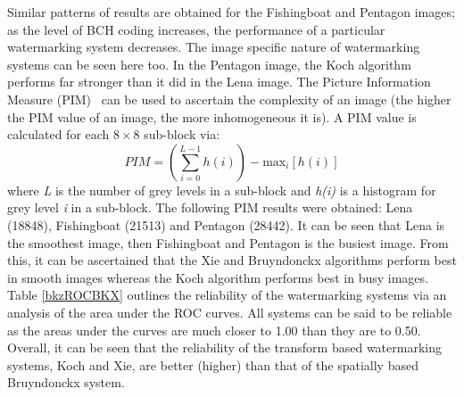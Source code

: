 \documentclass[10pt,twocolumn]{article}
\begin{document}
Similar patterns of results are obtained for the Fishingboat and Pentagon images; as the level of BCH coding increases,
the performance of a particular watermarking system decreases. The image specific nature of watermarking systems can be
seen here too. In the Pentagon image, the Koch algorithm performs far stronger than it did in the Lena image. 
The Picture Information Measure (PIM)~\cite{BKX:shinPIM} 
can be used to ascertain the complexity of an image (the higher the PIM value of an image, the more inhomogeneous it is).
A PIM value is calculated for each $8\times8$ sub-block via:
\begin{equation}
	PIM = \left( \sum^{L-1}_{i=0}h(i) \right) - \mbox{max}_{i}[h(i)]
\end{equation}
where \emph{L} is the number of grey levels in a sub-block and \emph{h(i)} is a histogram for grey level \emph{i} in a sub-block.
The following PIM results were obtained: Lena (18848), Fishingboat (21513) and Pentagon (28442). It can be seen that 
Lena is the smoothest image, then Fishingboat and Pentagon is the busiest image. From this, it can be ascertained that 
the Xie and Bruyndonckx algorithms perform best in smooth images whereas the Koch algorithm performs best in busy images. 
Table \ref{bkzROCBKX} outlines the reliability of the watermarking systems via an analysis of the area under the ROC curves.
All systems can be said to be reliable as the areas under the curves are much closer to 1.00 than they are to 0.50.
Overall, it can be seen that the reliability of the transform based watermarking systems, Koch and Xie, are better (higher)
than that of the spatially based Bruyndonckx system. 
\end{document}
